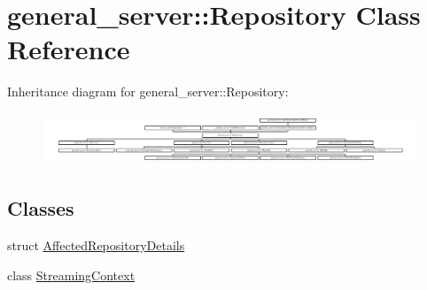 \hypertarget{classgeneral__server_1_1Repository}{\section{general\-\_\-server\-:\-:\-Repository \-Class \-Reference}
\label{classgeneral__server_1_1Repository}
}
\-Inheritance diagram for general\-\_\-server\-:\-:\-Repository\-:\begin{figure}[H]
\begin{center}
\leavevmode
\includegraphics[height=1.573034cm]{classgeneral__server_1_1Repository}
\end{center}
\end{figure}
\subsection*{\-Classes}
\begin{DoxyCompactItemize}
\item 
struct \hyperlink{structgeneral__server_1_1Repository_1_1AffectedRepositoryDetails}{\-Affected\-Repository\-Details}
\item 
class \hyperlink{classgeneral__server_1_1Repository_1_1StreamingContext}{\-Streaming\-Context}
\end{DoxyCompactItemize}
